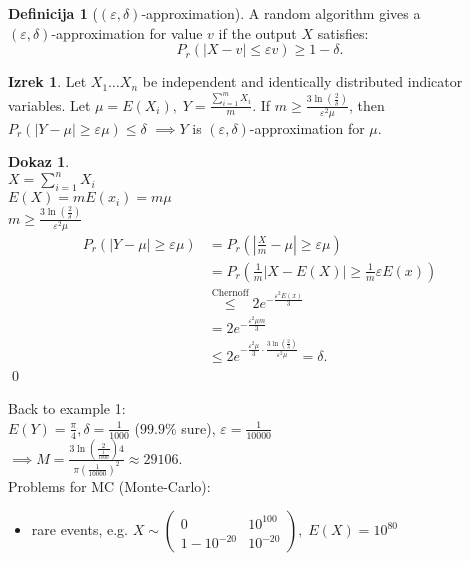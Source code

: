 \documentclass[a4paper, 12pt]{book}
\theoremstyle{definition}
\newtheorem{defn}[counter]{Definicija}
\newtheorem{theorem}[counter]{Izrek}
\newtheorem{pro}[counter]{Dokaz}
\theoremstyle{remark}
\begin{document}
\begin{defn}[$(\varepsilon,\delta)$-approximation]
  A random algorithm gives a \\
  $(\varepsilon,\delta)$-approximation for value $v$ if the output $X$ satisfies:
  \begin{equation*}
    P_r\left(|X-v| \leq \varepsilon v\right) \geq 1 - \delta.
  \end{equation*}
\end{defn}
\begin{theorem}
  Let $X_1 \dots X_n$ be independent and identically distributed indicator variables.
  Let $\mu = E(X_i), \; Y = \frac{\sum_{i=1}^{m} X_i}{m}$.
  If $m \geq \frac{3 \ln\left(\frac{2}{\delta}\right)}{\varepsilon^2 \mu}$, then
  $P_r\left(|Y-\mu| \geq \varepsilon \mu\right) \leq \delta$
  $\implies Y$ is $(\varepsilon,\delta)$-approximation for $\mu$.
\end{theorem}
\begin{pro} \text{} \\
  $X = \sum_{i=1}^{n} X_i$ \\
  $E(X) = m E(x_i) = m \mu$ \\
  $m \geq \frac{3 \ln\left(\frac{2}{\delta}\right)}{\varepsilon^2 \mu}$
  \begin{align*}
    P_r\left(|Y-\mu| \geq \varepsilon \mu\right) &= P_r\left(\left|\frac{X}{m}-\mu\right| \geq \varepsilon \mu\right) \\
    &= P_r\left(\frac{1}{m} \left|X-E(X)\right| \geq \frac{1}{m} \varepsilon E(x)\right) \\
    &\stackrel{\text{Chernoff}}{\leq} 2 e^{-\frac{\varepsilon^2 E(x)}{3}} \\
    &= 2 e^{-\frac{\varepsilon^2 \mu m}{3}} \\
    &\leq 2 e^{-\frac{\varepsilon^2 \mu}{3} \cdot \frac{3 \ln\left(\frac{2}{\delta}\right)}{\varepsilon^2 \mu}} = \delta.
  \end{align*}
  \qed
\end{pro}
Back to example 1: \\
$E(Y) = \frac{\pi}{4}, \delta = \frac{1}{1000}$ ($99.9\%$ sure), $\varepsilon = \frac{1}{10000}$ \\
$\implies M = \frac{3 \ln\left(\frac{2}{\frac{1}{1000}}\right) 4}{\pi \left(\frac{1}{10000}\right)^2} \approx 29106$. \\
Problems for MC (Monte-Carlo):
\begin{itemize}
  \item rare events, e.g. $X \sim \begin{pmatrix}0 & 10^{100} \\ 1-10^{-20} & 10^{-20}\end{pmatrix}, \; E(X) = 10^{80}$
\end{itemize}
\end{document}
